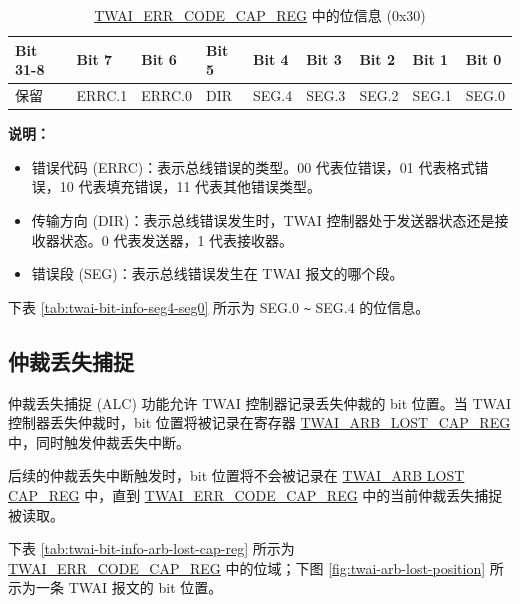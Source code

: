 \documentclass[main\_\_CN.tex]{subfiles}
\begin{document}
\begin{longtable}[c]{|p{1.4cm}|p{1.4cm}|p{1.4cm}|p{1.4cm}|p{1.4cm}|p{1.4cm}|p{1.4cm}|p{1.4cm}|p{1.4cm}|}
    \caption{\hyperref[regdesc:TWAIERRCODECAPREG]{TWAI\_ERR\_CODE\_CAP\_REG} 中的位信息 (0x30)}
    \label{tab:twai-bit-info-error-code-cap-reg-reg-cn}\\
    \hline
    \rowcolor{lightgray}
    \textbf{Bit 31-8} & \textbf{Bit 7} & \textbf{Bit 6} & \textbf{Bit 5} & \textbf{Bit 4} & \textbf{Bit 3} & \textbf{Bit 2} & \textbf{Bit 1} & \textbf{Bit 0}\\\hline
    保留 & ERRC.1 & ERRC.0 & DIR & SEG.4 & SEG.3 & SEG.2 & SEG.1 & SEG.0\\
    \hline
\end{longtable}
\vspace{-1.5em}
{\bfseries 说明：}\\
\begin{itemize}
    \item 错误代码 (ERRC)：表示总线错误的类型。00 代表位错误，01 代表格式错误，10 代表填充错误，11 代表其他错误类型。
    \item 传输方向 (DIR)：表示总线错误发生时，TWAI 控制器处于发送器状态还是接收器状态。0 代表发送器，1 代表接收器。
    \item 错误段 (SEG)：表示总线错误发生在 TWAI 报文的哪个段。
\end{itemize}

下表 \ref{tab:twai-bit-info-seg4-seg0} 所示为 SEG.0 \verb+~+ SEG.4 的位信息。



\subsection{仲裁丢失捕捉}

仲裁丢失捕捉 (ALC) 功能允许 TWAI 控制器记录丢失仲裁的 bit 位置。当 TWAI 控制器丢失仲裁时，bit 位置将被记录在寄存器 \hyperref[regdesc:TWAIARBLOSTCAPREG]{TWAI\_ARB\_LOST\_CAP\_REG} 中，同时触发仲裁丢失中断。

后续的仲裁丢失中断触发时，bit 位置将不会被记录在 \hyperref[regdesc:TWAIARBLOSTCAPREG]{TWAI\_ARB LOST CAP\_REG} 中，直到 \hyperref[regdesc:TWAIERRCODECAPREG]{TWAI\_ERR\_CODE\_CAP\_REG} 中的当前仲裁丢失捕捉被读取。

下表 \ref{tab:twai-bit-info-arb-lost-cap-reg} 所示为 \hyperref[regdesc:TWAIERRCODECAPREG]{TWAI\_ERR\_CODE\_CAP\_REG} 中的位域；下图 \ref{fig:twai-arb-lost-position} 所示为一条 TWAI 报文的 bit 位置。
\end{document}
